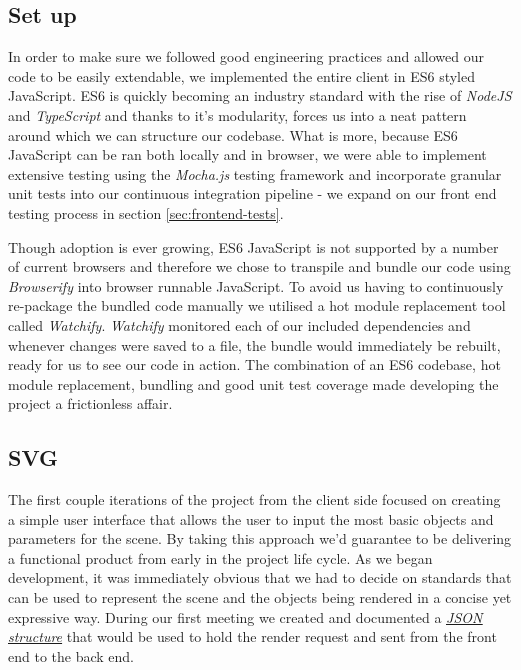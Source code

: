 \documentclass[a4paper]{report}
\begin{document}
	\subsection{Set up}
	In order to make sure we followed good engineering practices and allowed our code to be easily extendable, we implemented the entire client in ES6 styled JavaScript. ES6 is quickly becoming an industry standard with the rise of \textit{NodeJS} and \textit{TypeScript} and thanks to it's modularity, forces us into a neat pattern around which we can structure our codebase. What is more, because ES6 JavaScript can be ran both locally and in browser, we were able to implement extensive testing using the \textit{Mocha.js} testing framework and incorporate granular unit tests into our continuous integration pipeline - we expand on our front end testing process in section \ref{sec:frontend-tests}.\newline
	\par Though adoption is ever growing, ES6 JavaScript is not supported by a number of current browsers and therefore we chose to transpile and bundle our code using \textit{Browserify} into browser runnable JavaScript. To avoid us having to continuously re-package the bundled code manually we utilised a hot module replacement tool called \textit{Watchify}. \textit{Watchify} monitored each of our included dependencies and whenever changes were saved to a file, the bundle would immediately be rebuilt, ready for us to see our code in action. The combination of an ES6 codebase, hot module replacement, bundling and good unit test coverage made developing the project a frictionless affair.
	
	\subsection{SVG} \label{sec:svg}
	
	The first couple iterations of the project from the client side focused on creating a simple user interface that allows the user to input the most basic objects and parameters for the scene. By taking this approach we'd guarantee to be delivering a functional product from early in the project life cycle. As we began development, it was immediately obvious that we had to decide on standards that can be used to represent the scene and the objects being rendered in a concise yet expressive way. During our first meeting we created and documented a  \href{https://github.com/davidbenicek/raytracer/wiki/Initial-JSON-payload-design}{\underline{\textit{JSON structure}}} that would be used to hold the render request and sent from the front end to the back end.\newline
	
\end{document}
